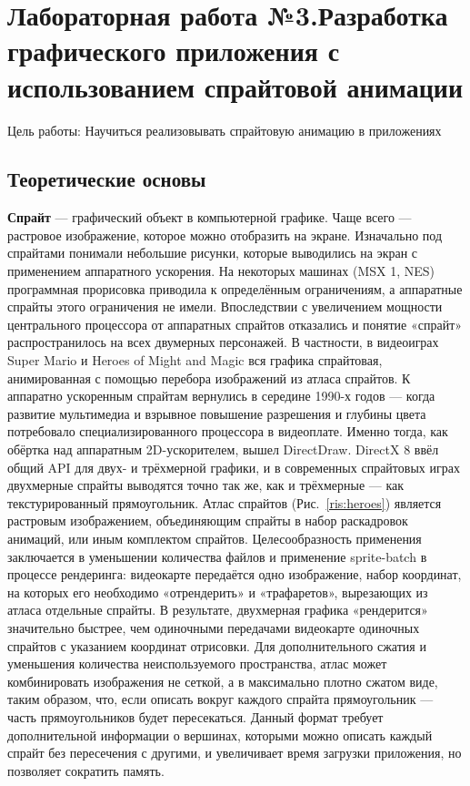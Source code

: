 \documentclass[a4paper]{article}
\begin{document}
\newpage
\section{Лабораторная работа №3.\newline Разработка графического приложения с использованием спрайтовой анимации}

Цель работы: Научиться реализовывать спрайтовую анимацию в приложениях

\subsection{Теоретические основы}

\textbf{Спрайт} --- графический объект в компьютерной графике. Чаще всего --- растровое изображение, которое можно отобразить на экране. Изначально под спрайтами понимали небольшие рисунки, которые выводились на экран с применением аппаратного ускорения. На некоторых машинах (MSX 1, NES) программная прорисовка приводила к определённым ограничениям, а аппаратные спрайты этого ограничения не имели. Впоследствии с увеличением мощности центрального процессора от аппаратных спрайтов отказались и понятие «спрайт» распространилось на всех двумерных персонажей. В частности, в видеоиграх Super Mario и Heroes of Might and Magic вся графика спрайтовая, анимированная с помощью перебора изображений из атласа спрайтов. К аппаратно ускоренным спрайтам вернулись в середине 1990-х годов — когда развитие мультимедиа и взрывное повышение разрешения и глубины цвета потребовало специализированного процессора в видеоплате. Именно тогда, как обёртка над аппаратным 2D-ускорителем, вышел DirectDraw. DirectX 8 ввёл общий API для двух- и трёхмерной графики, и в современных спрайтовых играх двухмерные спрайты выводятся точно так же, как и трёхмерные — как текстурированный прямоугольник. Атлас спрайтов (Рис.~\ref{ris:heroes}) является растровым изображением, объединяющим спрайты в набор раскадровок анимаций, или иным комплектом спрайтов. Целесообразность применения заключается в уменьшении количества файлов и применение sprite-batch в процессе рендеринга: видеокарте передаётся одно изображение, набор координат, на которых его необходимо «отрендерить» и «трафаретов», вырезающих из атласа отдельные спрайты. В результате, двухмерная графика «рендерится» значительно быстрее, чем одиночными передачами видеокарте одиночных спрайтов с указанием координат отрисовки. Для дополнительного сжатия и уменьшения количества неиспользуемого пространства, атлас может комбинировать изображения не сеткой, а в максимально плотно сжатом виде, таким образом, что, если описать вокруг каждого спрайта прямоугольник — часть прямоугольников будет пересекаться. Данный формат требует дополнительной информации о вершинах, которыми можно описать каждый спрайт без пересечения с другими, и увеличивает время загрузки приложения, но позволяет сократить память.
\end{document}
